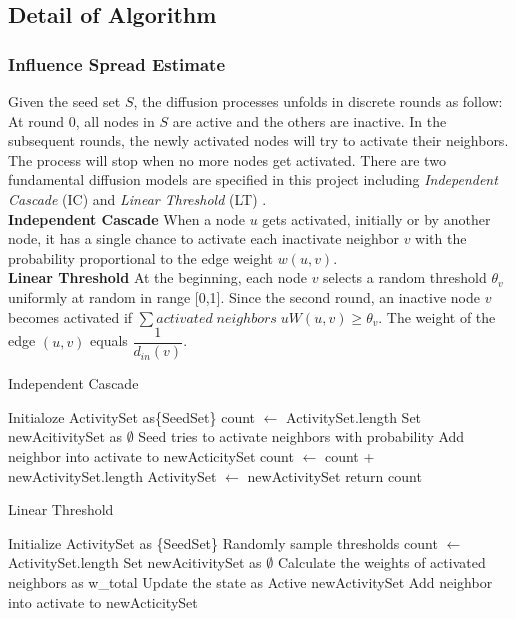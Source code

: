 \documentclass[conference,compsoc]{IEEEtran}
\begin{document}
\subsection{Detail of Algorithm}
\subsubsection{Influence Spread Estimate}
Given the seed set $S$, the diffusion processes unfolds in discrete rounds as follow: At round 0, all nodes in $S$ are active and the others are inactive. In the subsequent rounds, the newly activated nodes will try to activate their neighbors. The process will stop when no more nodes get activated. 
There are two fundamental diffusion models are specified in this project including \textit{Independent Cascade} (IC) and \textit{Linear Threshold} (LT) .\\
\noindent \textbf{Independent Cascade} When a node $u$ gets activated, initially or by another node, it has a single chance to activate each inactivate neighbor $v$ with the probability proportional to the edge weight $w(u, v)$.\\
\noindent \textbf{Linear Threshold} At the beginning, each node $v$ selects a random threshold $\theta_v$ uniformly at random in range [0,1]. Since the second round, an inactive node $v$ becomes activated if $\sum{activated\; neighbors\;u} W(u,v) \geq \theta_v$. The weight of the edge $(u,v)$ equals $\dfrac{1}{d_{in}(v)}$.


\begin{algorithm}[H]
	\caption{Independent Cascade}
	\begin{algorithmic}[1]
		\State Initialoze ActivitySet as\{SeedSet\}
		\State count $\gets$ ActivitySet.length
		\State Set newAcitivitySet as $\emptyset$ 
			\State Seed tries to activate neighbors with probability
				\State Add neighbor into activate to newActicitySet
				\EndIf
			\EndFor
		\EndFor
		\State count $\gets$ count + newActivitySet.length
		\State ActivitySet $\gets$ newActivitySet
		\EndWhile
		\EndFunction
		\State return count
	\end{algorithmic}
\end{algorithm}

\begin{algorithm}[H]
	\caption{Linear Threshold}
	\begin{algorithmic}[1]
		\State Initialize ActivitySet as \{SeedSet\}
		\State Randomly sample thresholds
		\State count $\gets$ ActivitySet.length
		\State Set newAcitivitySet as $\emptyset$ 
			\State Calculate the weights of activated neighbors as w\_total
			\State Update the state as Active
			\State newActivitySet
			\EndIf
			\State Add neighbor into activate to newActicitySet
			\EndFor
		\EndFor
		\EndWhile
		\EndFunction
	\end{algorithmic}
\end{algorithm}
\end{document}
